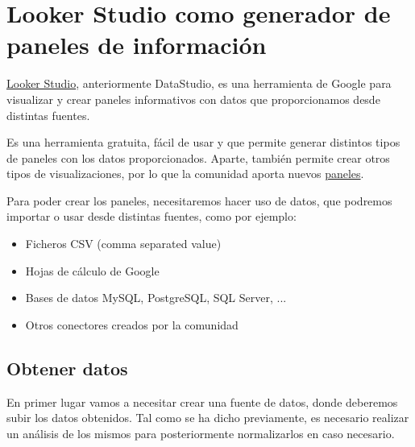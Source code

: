 \chapter{Looker Studio como generador de paneles de información}

\href{https://lookerstudio.google.com/}{Looker Studio}, anteriormente DataStudio, es una herramienta de Google para visualizar y crear paneles informativos con datos que proporcionamos desde distintas fuentes.

Es una herramienta gratuita, fácil de usar y que permite generar distintos tipos de paneles con los datos proporcionados. Aparte, también permite crear otros tipos de visualizaciones, por lo que la comunidad aporta nuevos \href{https://lookerstudio.google.com/visualization}{paneles}.

Para poder crear los paneles, necesitaremos hacer uso de datos, que podremos importar o usar desde distintas fuentes, como por ejemplo:
\begin{itemize}
    \item Ficheros CSV (comma separated value)
    \item Hojas de cálculo de Google
    \item Bases de datos MySQL, PostgreSQL, SQL Server, ...
    \item Otros conectores creados por la comunidad
\end{itemize}

\section{Obtener datos}

En primer lugar vamos a necesitar crear una fuente de datos, donde deberemos subir los datos obtenidos. Tal como se ha dicho previamente, es necesario realizar un análisis de los mismos para posteriormente normalizarlos en caso necesario.

